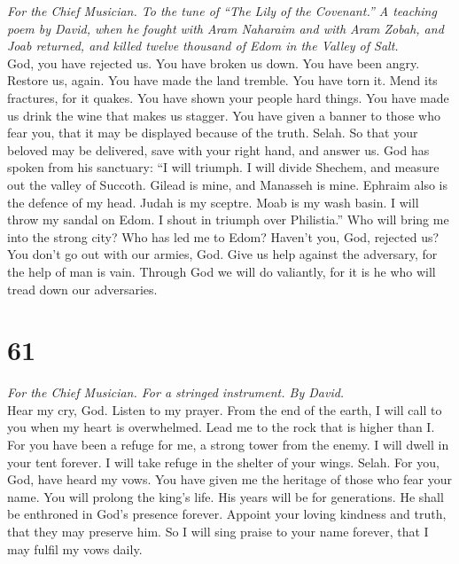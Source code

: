 \emph{For the Chief Musician. To the tune of ``The Lily of the
Covenant.'' A teaching poem by David, when he fought with Aram Naharaim
and with Aram Zobah, and Joab returned, and killed twelve thousand of
Edom in the Valley of Salt.}\\
 God, you have rejected us. You have broken us down. You
have been angry. Restore us, again.  You have made the
land tremble. You have torn it. Mend its fractures, for it quakes.
 You have shown your people hard things. You have made us
drink the wine that makes us stagger.  You have given a
banner to those who fear you, that it may be displayed because of the
truth. Selah.  So that your beloved may be delivered, save
with your right hand, and answer us.  God has spoken from
his sanctuary: ``I will triumph. I will divide Shechem, and measure out
the valley of Succoth.  Gilead is mine, and Manasseh is
mine. Ephraim also is the defence of my head. Judah is my sceptre.
 Moab is my wash basin. I will throw my sandal on Edom. I
shout in triumph over Philistia.''  Who will bring me into
the strong city? Who has led me to Edom?  Haven't you,
God, rejected us? You don't go out with our armies, God. 
Give us help against the adversary, for the help of man is vain.
 Through God we will do valiantly, for it is he who will
tread down our adversaries.

\hypertarget{section-60}{%
\section{61}\label{section-60}}

\emph{For the Chief Musician. For a stringed instrument. By David.}\\
 Hear my cry, God. Listen to my prayer. 
From the end of the earth, I will call to you when my heart is
overwhelmed. Lead me to the rock that is higher than I. 
For you have been a refuge for me, a strong tower from the enemy.
 I will dwell in your tent forever. I will take refuge in
the shelter of your wings. Selah.  For you, God, have
heard my vows. You have given me the heritage of those who fear your
name.  You will prolong the king's life. His years will be
for generations.  He shall be enthroned in God's presence
forever. Appoint your loving kindness and truth, that they may preserve
him.  So I will sing praise to your name forever, that I
may fulfil my vows daily.


